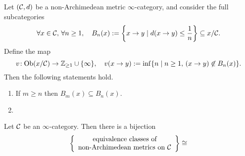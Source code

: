 \begin{proposition}
	Let \((\mathcal{C},d)\) be a non-Archimedean metric \(\infty\)-category, and consider the full subcategories
	\[ \forall x\in\mathcal{C},\, \forall n\geq 1,\quad B_n(x) := \left\{ x\to y \mid d(x\to y) \leq \frac{1}{n} \right\} \subseteq x/\mathcal{C}. \]
	Define the map
	\[ v\!: \operatorname{Ob}(x/\mathcal{C}) \to \mathbb{Z}_{\geq 1}\cup\{\infty\},\quad v(x\to y) := \inf\{ n \mid n\geq 1,\, (x\to y) \not\in B_n(x) \}. \]
	Then the following statements hold.
	\begin{enumerate}[label=(\arabic*)]
		\item If \(m \geq n\) then \(B_m(x) \subseteq B_n(x)\).
		\item 
	\end{enumerate}
\end{proposition}

\begin{theorem}
	Let \(\mathcal{C}\) be an \(\infty\)-category. Then there is a bijection
	\[ \left\{ \begin{array}{c}
		\text{equivalence classes of}\\
		\text{non-Archimedean metrics on } \mathcal{C}
	\end{array} \right\} \cong  \]
\end{theorem}
